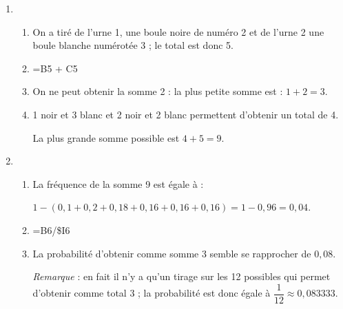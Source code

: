 \begin{enumerate}
\item 
	\begin{enumerate}
			\item On a tiré de l’urne 1, une boule noire de numéro 2 et de l’urne 2 une boule blanche numérotée 3 ; le total est donc 5.
			\item =B5 + C5
			\item On ne peut obtenir la somme 2 : la plus petite somme est : $1 + 2 = 3$.
			\item 1 noir et 3 blanc et 2 noir et 2 blanc permettent d’obtenir un total de 4.
			
La plus grande somme possible est $4 + 5 = 9$.
	\end{enumerate}
\item 
		\begin{enumerate}
			\item La fréquence de la somme 9 est égale à :
			
$1 - (0,1 +0,2 + 0,18 + 0,16 + 0,16 + 0,16) = 1 - 0,96 = 0,04$.
			\item =B6/\$I6
			\item La probabilité d’obtenir comme somme 3 semble se rapprocher de $0,08$.
			
\emph{Remarque } : en fait il n’y a qu’un tirage sur les 12 possibles qui permet d’obtenir comme total 3 ; la probabilité est donc égale à $\dfrac{1}{12} \approx 0,083333$.
		\end{enumerate}
\end{enumerate}
